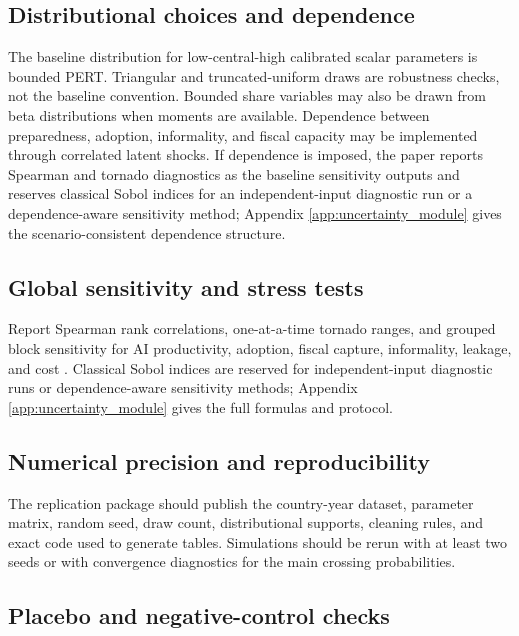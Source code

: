 \documentclass[11pt,a4paper]{article}
\begin{document}
\subsection{Distributional choices and dependence}

The baseline distribution for low-central-high calibrated scalar parameters is bounded PERT. Triangular and truncated-uniform draws are robustness checks, not the baseline convention. Bounded share variables may also be drawn from beta distributions when moments are available. Dependence between preparedness, adoption, informality, and fiscal capacity may be implemented through correlated latent shocks. If dependence is imposed, the paper reports Spearman and tornado diagnostics as the baseline sensitivity outputs and reserves classical Sobol indices for an independent-input diagnostic run or a dependence-aware sensitivity method; Appendix \ref{app:uncertainty_module} gives the scenario-consistent dependence structure.

\subsection{Global sensitivity and stress tests}

Report Spearman rank correlations, one-at-a-time tornado ranges, and grouped block sensitivity for AI productivity, adoption, fiscal capture, informality, leakage, and cost \citep{mckay1979lhs,morris1991factorial,saltelli2008global,sobol2001global}. Classical Sobol indices are reserved for independent-input diagnostic runs or dependence-aware sensitivity methods; Appendix \ref{app:uncertainty_module} gives the full formulas and protocol.

\subsection{Numerical precision and reproducibility}

The replication package should publish the country-year dataset, parameter matrix, random seed, draw count, distributional supports, cleaning rules, and exact code used to generate tables. Simulations should be rerun with at least two seeds or with convergence diagnostics for the main crossing probabilities.

\subsection{Placebo and negative-control checks}
\end{document}
